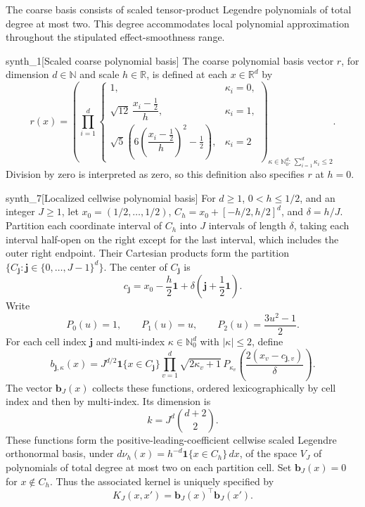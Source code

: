 \documentclass[11pt]{article}
\begin{document}
The coarse basis  consists of scaled tensor-product Legendre polynomials of total degree at most two. This degree accommodates local polynomial approximation throughout the stipulated effect-smoothness range.

\begin{definitionv}{synth_1}[Scaled coarse polynomial basis]
The coarse polynomial basis vector \(r\), for dimension \(d\in\mathbb N\) and scale \(h\in\mathbb R\), is defined at each \(x\in\mathbb R^d\) by
\[
r(x)=
\left(
\prod_{i=1}^{d}
\begin{cases}
1, & \kappa_i=0,\\
\sqrt{12}\,\dfrac{x_i-\tfrac12}{h}, & \kappa_i=1,\\
\sqrt{5}\left(6\left(\dfrac{x_i-\tfrac12}{h}\right)^2-\tfrac12\right),
& \kappa_i=2
\end{cases}
\right)_{\kappa\in\mathbb N_0^d:\,\sum_{i=1}^{d}\kappa_i\le 2}.
\]
Division by zero is interpreted as zero, so this definition also specifies \(r\) at \(h=0\).
\end{definitionv}

\begin{definitionv}{synth_7}[Localized cellwise polynomial basis]
For \(d\ge1\), \(0<h\le1/2\), and an integer \(J\ge1\), let \(x_0=(1/2,\ldots,1/2)\), \(C_h=x_0+[-h/2,h/2]^d\), and \(\delta=h/J\). Partition each coordinate interval of \(C_h\) into \(J\) intervals of length \(\delta\), taking each interval half-open on the right except for the last interval, which includes the outer right endpoint. Their Cartesian products form the partition \(\{C_{\mathbf j}:\mathbf j\in\{0,\ldots,J-1\}^d\}\). The center of \(C_{\mathbf j}\) is
\[
c_{\mathbf j}=x_0-\frac h2\mathbf1+\delta\left(\mathbf j+\frac12\mathbf1\right).
\]
Write
\[
P_0(u)=1,\qquad P_1(u)=u,\qquad P_2(u)=\frac{3u^2-1}{2}.
\]
For each cell index \(\mathbf j\) and multi-index \(\kappa\in\mathbb N_0^d\) with \(|\kappa|\le2\), define
\[
b_{\mathbf j,\kappa}(x)
=
J^{d/2}\mathbf1\{x\in C_{\mathbf j}\}
\prod_{v=1}^d
\sqrt{2\kappa_v+1}\,
P_{\kappa_v}\!\left(\frac{2(x_v-c_{\mathbf j,v})}{\delta}\right).
\]
The vector \(\mathbf b_J(x)\) collects these functions, ordered lexicographically by cell index and then by multi-index. Its dimension is
\[
k=J^d\binom{d+2}{2}.
\]
These functions form the positive-leading-coefficient cellwise scaled Legendre orthonormal basis, under \(d\nu_h(x)=h^{-d}\mathbf1\{x\in C_h\}\,dx\), of the space \(V_J\) of polynomials of total degree at most two on each partition cell. Set \(\mathbf b_J(x)=0\) for \(x\notin C_h\). Thus the associated kernel is uniquely specified by
\[
K_J(x,x')=\mathbf b_J(x)^\top\mathbf b_J(x').
\]
\end{definitionv}
\end{document}

